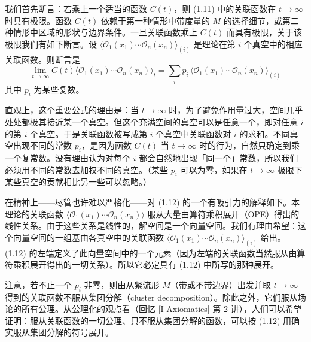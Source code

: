 我们首先断言：若乘上一个适当的函数 $C(t)$，则 (1.11) 中的关联函数在 $t\to\infty$ 时具有极限。函数 $C(t)$ 依赖于第一种情形中带度量的 $M$ 的选择细节，或第二种情形中区域的形状与边界条件。一旦关联函数乘上 $C(t)$ 而具有极限，关于该极限我们有如下断言。设 $\langle\mathcal{O}_1(x_1)\cdots\mathcal{O}_n(x_n)\rangle_{(i)}$ 是理论在第 $i$ 个真空中的相应关联函数。则断言是
\begin{equation}
  \tag{1.12}
  \label{eq:1-12}
  \lim_{t\to\infty}C(t)\langle\mathcal{O}_1(x_1)\cdots\mathcal{O}_n(x_n)\rangle_t
  =\sum_i p_i\,\langle\mathcal{O}_1(x_1)\cdots\mathcal{O}_n(x_n)\rangle_{(i)}
\end{equation}
其中 $p_i$ 为某些复数。

直观上，这个重要公式的理由是：当 $t\to\infty$ 时，为了避免作用量过大，空间几乎处处都极其接近某一个真空。但这个充满空间的真空可以是任意一个，即对任意 $i$ 的第 $i$ 个真空。于是关联函数被写成第 $i$ 个真空中关联函数对 $i$ 的求和。不同真空出现不同的常数 $p_i$，是因为函数 $C(t)$ 当 $t\to\infty$ 时的行为，自然只确定到乘一个复常数。没有理由认为对每个 $i$ 都会自然地出现「同一个」常数，所以我们必须用不同的常数去加权不同的真空。（某些 $p_i$ 可以为零，如果在 $t\to\infty$ 极限下某些真空的贡献相比另一些可以忽略。）

在精神上——尽管也许难以严格化——对 (1.12) 的一个有吸引力的解释如下。本理论的关联函数 $\langle\mathcal{O}_1(x_1)\cdots\mathcal{O}_n(x_n)\rangle$ 服从大量由算符乘积展开（OPE）得出的线性关系。由于这些关系是线性的，解空间是一个向量空间。我们有理由希望：这个向量空间的一组基由各真空中的关联函数 $\langle\mathcal{O}_1(x_1)\cdots\mathcal{O}_n(x_n)\rangle_{(i)}$ 给出。(1.12) 的左端定义了此向量空间中的一个元素（因为左端的关联函数当然服从由算符乘积展开得出的一切关系）。所以它必定具有 (1.12) 中所写的那种展开。


注意，若不止一个 $p_i$ 非零，则由从紧流形 $M$（带或不带边界）出发并取 $t\to\infty$ 得到的关联函数不服从集团分解（cluster decomposition）。除此之外，它们服从场论的所有公理。从公理化的观点看（回忆 [I-Axiomatics] 第 2 讲），人们可以希望证明：服从关联函数的一切公理、只不服从集团分解的函数，可以按 (1.12) 用确实服从集团分解的符号展开。

